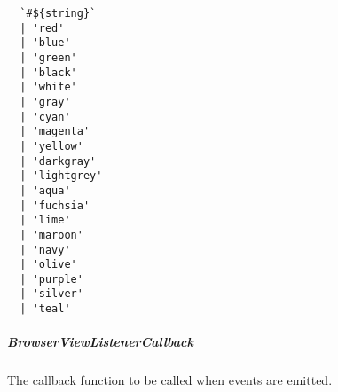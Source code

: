 \begin{verbatim}
  `#${string}`
  | 'red'
  | 'blue'
  | 'green'
  | 'black'
  | 'white'
  | 'gray'
  | 'cyan'
  | 'magenta'
  | 'yellow'
  | 'darkgray'
  | 'lightgrey'
  | 'aqua'
  | 'fuchsia'
  | 'lime'
  | 'maroon'
  | 'navy'
  | 'olive'
  | 'purple'
  | 'silver'
  | 'teal'
\end{verbatim}


\subparagraph{BrowserViewListenerCallback}

The callback function to be called when events are emitted.

